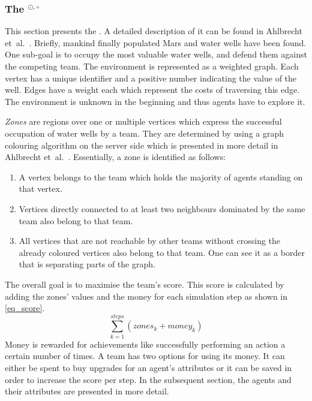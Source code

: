 \subsubsection[The \mars{}]{The \mars{}$^{\odot,\circ}$}\label{fun:mapc_general}
This section presents the \mars{}.
A detailed description of it can be found in Ahlbrecht et~al.~\cite{ahlbrecht_mapc_2014}.
Briefly, mankind finally populated Mars and water wells have been found.
One sub-goal is to occupy the most valuable water wells, and defend them against the competing team.
The environment is represented as a weighted graph.
Each vertex has a unique identifier and a positive number indicating the value of the well.
Edges have a weight each which represent the costs of traversing this edge.
The environment is unknown in the beginning and thus agents have to explore it.

\emph{Zones} are regions over one or multiple vertices which express the successful occupation of water wells by a team.
They are determined by using a graph colouring algorithm on the server side which is presented in more detail in Ahlbrecht et~al.~\cite{ahlbrecht_mapc_2014}.
Essentially, a zone is identified as follows:
\begin{enumerate}
	\item A vertex belongs to the team which holds the majority of agents standing on that vertex.
	\item Vertices directly connected to at least two neighbours dominated by the same team also belong to that team.
	\item All vertices that are not reachable by other teams without crossing the already coloured vertices also belong to that team.
    One can see it as a border that	is separating parts of the graph.
\end{enumerate}

The overall goal is to maximise the team's score.
This score is calculated by adding the zones' values and the money for each simulation step as shown in \autoref{eq_score}.
\begin{equation}\label{eq_score}
  \sum_{k=1}^\textit{steps}\left(\textit{zones}_k + \textit{money}_k\right)
\end{equation}
Money is rewarded for achievements like successfully performing an action a certain number of times.
A team has two options for using its money.
It can either be spent to buy upgrades for an agent's attributes or it can be saved in order to increase the score per step.
In the subsequent section, the agents and their attributes are presented in more detail.

